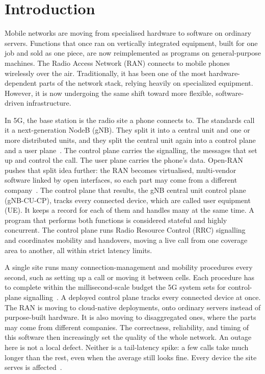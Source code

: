 \documentclass[english,oneside,a4paper,censored,csm,software-track-2020]{HYthesisML}
\begin{document}
\cleardoublepage
\mainmatter


\chapter{Introduction}

Mobile networks are moving from specialised hardware to software on ordinary servers.
Functions that once ran on vertically integrated equipment, built for one job and sold
as one piece, are now reimplemented as programs on general-purpose machines. 
The Radio Access Network (RAN) connects to mobile phones wirelessly over the air. 
Traditionally, it has been one of the most hardware-dependent parts of the network stack, 
relying heavily on specialized equipment. However, it is now undergoing the same shift 
toward more flexible, software-driven infrastructure.

In 5G, the base station is the radio site a phone connects to. The standards call it a
next-generation NodeB (gNB). They split it into a central unit and one or more
distributed units, and they split the central unit again into a control plane and a
user plane~\cite{3gpp38401,3gpp38300}. The control plane carries the signalling, the
messages that set up and control the call. The user plane carries the phone’s data.
Open-RAN pushes that split idea further: the RAN becomes virtualised, multi-vendor
software linked by open interfaces, so each part may come from a different
company~\cite{polese2023oran}. The control plane that results, the gNB central unit
control plane (gNB-CU-CP), tracks every connected device, which are called user equipment (UE). It keeps a record
for each of them and handles many at the same time. A program that performs both functions is 
considered stateful and highly concurrent. The control plane runs
Radio Resource Control (RRC) signalling~\cite{3gpp38331} and coordinates mobility and
handovers, moving a live call from one coverage area to another, all within strict
latency limits.

A single site runs many connection-management and mobility procedures every second,
such as setting up a call or moving it between cells. Each procedure has to complete
within the millisecond-scale budget the 5G system sets for control-plane
signalling~\cite{3gpp38913}. A deployed control plane tracks every connected device at
once. The RAN is moving to cloud-native deployments, onto ordinary servers instead of
purpose-built hardware. It is also moving to disaggregated ones, where the parts may
come from different companies. The correctness, reliability, and timing of this
software then increasingly set the quality of the whole network. An outage here is not
a local defect. Neither is a tail-latency spike: a few calls take much longer than the
rest, even when the average still looks fine. Every device the site serves is
affected~\cite{dean2013tail,barroso2017microseconds}.
\end{document}
